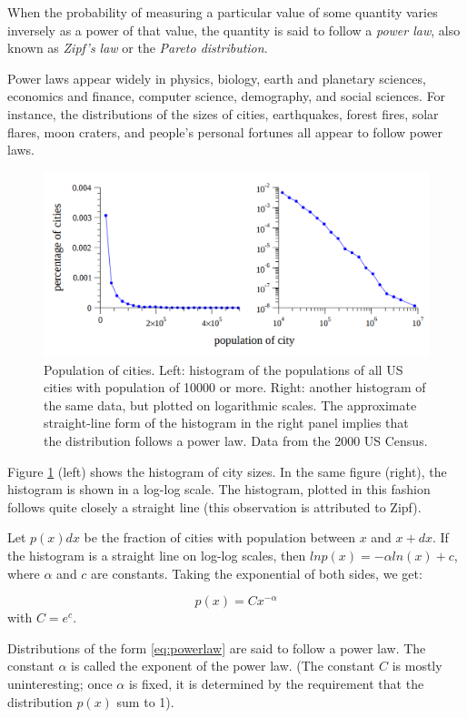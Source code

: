 \documentclass[a4paper, 12pt]{report}
\begin{document}
When the probability of measuring a particular value of some quantity varies inversely as
a power of that value, the quantity is said to follow a \textit{power law}, also known as \textit{Zipf’s law} or the \textit{Pareto distribution}. 


Power laws appear widely in physics, biology, earth and planetary sciences, economics and finance, computer science, demography, and social sciences. For instance, the distributions of the sizes of cities, earthquakes, forest fires, solar flares, moon craters, and people’s personal fortunes all appear to follow power laws.

\begin{figure}[!ht]
\centering
\includegraphics[width=0.7\linewidth]{./population-of-cities}
\caption{
Population of cities.  
Left: histogram of the populations of all US cities with population of 10000 or more. Right: another histogram of
the same data, but plotted on logarithmic scales. The approximate straight-line form of the histogram in the right panel
implies that the distribution follows a power law. Data from the 2000 US Census.
}
\label{fig:populations-of-cities}
\end{figure}

Figure \ref{fig:populations-of-cities} (left) shows the histogram of city sizes. In the same figure (right), the histogram is shown in a log-log scale. The histogram, plotted in this fashion follows quite closely a straight line (this observation is attributed to Zipf).

Let $p(x)dx$ be the fraction of cities with population between $x$ and $x+dx$. If the histogram is a straight line on log-log scales, then $ln p(x) = - \alpha ln(x) + c$, where $\alpha$ and $c$ are constants. Taking
the exponential of both sides, we get:

\begin{equation}
\label{eq:powerlaw}
p(x) = Cx^{- \alpha}
\end{equation}
with $C = e^c$.

Distributions of the form \ref{eq:powerlaw} are said to follow a power law. The constant $\alpha$ is called the exponent of the power law. (The constant $C$ is mostly uninteresting; once $\alpha$ is fixed, it is determined by the requirement that the distribution $p(x)$ sum to 1).
\end{document}
